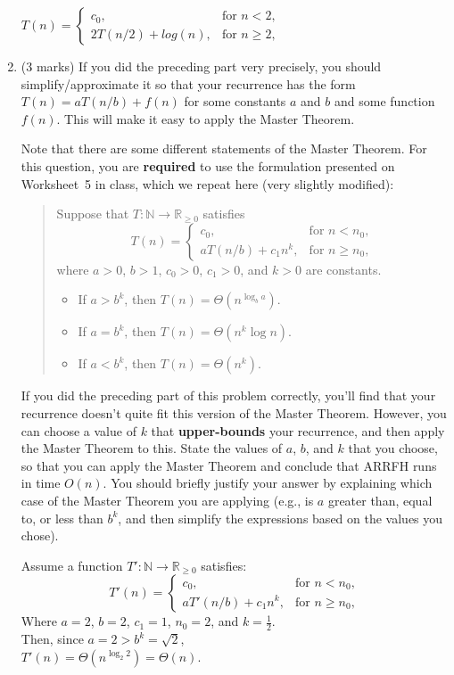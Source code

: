\documentclass[11pt]{article}
\begin{document}
\begin{enumerate}
\begin{soln}
$T(n) = \left\{
  \begin{array}{ll}
    c_0, & \mbox{for $n < 2$}, \\
    2T(n/2) + log(n), & \mbox{for $n \ge 2$}, 
  \end{array} \right.$
\end{soln}

\item (3 marks)
If you did the preceding part very precisely, you should simplify/approximate
it so that your recurrence has the form $T(n)=aT(n/b)+f(n)$ for
some constants $a$ and $b$ and some function $f(n)$.
This will make it easy to apply the Master Theorem.

Note that there are some different statements of the Master Theorem.
For this question, you are \textbf{required} to use the formulation
presented on Worksheet~5 in class, which we repeat here (very slightly modified):
\begin{quote}
  Suppose that $T: \mathbb{N} \rightarrow \mathbb{R}_{\ge 0}$ satisfies
  \[
  T(n) = \left\{
  \begin{array}{ll}
    c_0, & \mbox{for $n < n_0$}, \\
    a T(n/b) + c_1 n^k, & \mbox{for $n \ge n_0$},
  \end{array} \right.
  \]
  where $a > 0$, $b > 1$, $c_0 > 0$, $c_1 > 0$, and $k >0$ are constants.

  \begin{itemize}
    \item
If $a > b^k$, then $T(n) = \Theta(n^{\log_b a})$.
\item
If $a = b^k$, then $T(n) = \Theta(n^k \log n)$.
\item
If $a < b^k$, then $T(n) = \Theta(n^k)$.
\end{itemize}
\end{quote}

If you did the preceding part of this problem correctly, you'll find
that your recurrence doesn't quite fit this version of the Master Theorem.
However, you can choose a value of $k$ that \textbf{upper-bounds} your
recurrence, and then apply the Master Theorem to this.
State the values of $a$, $b$, and $k$ that you choose, so that you
can apply the Master Theorem and conclude that ARRFH runs in time
$O(n)$.  You should briefly justify your answer by explaining which
case of the Master Theorem you are applying (e.g., is $a$ greater than,
equal to, or less than $b^k$, and then simplify the expressions based
on the values you chose).

\begin{soln}
Assume a function $T': \mathbb{N} \rightarrow \mathbb{R}_{\ge 0}$ satisfies:
  \[
  T'(n) = \left\{
  \begin{array}{ll}
    c_0, & \mbox{for $n < n_0$}, \\
    a T'(n/b) + c_1 n^k, & \mbox{for $n \ge n_0$},
  \end{array} \right.
  \]
Where $a=2$, $b=2$, $c_1=1$, $n_0=2$, and $k=\frac{1}{2}$. \\
Then, since $a=2>b^k=\sqrt{2}$, \\
$T'(n)=\Theta(n^{\log_2 2})=\Theta(n)$. \\


\end{soln}
\end{enumerate}
\end{document}
